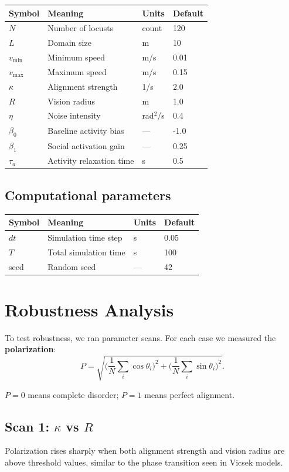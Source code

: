 \documentclass[11pt,a4paper]{article}
\begin{document}
\begin{tabular}{@{}llll@{}}
\toprule
Symbol & Meaning & Units & Default \\
\midrule
$N$ & Number of locusts & count & 120 \\
$L$ & Domain size & m & 10 \\
$v_{\min}$ & Minimum speed & m/s & 0.01 \\
$v_{\max}$ & Maximum speed & m/s & 0.15 \\
$\kappa$ & Alignment strength & 1/s & 2.0 \\
$R$ & Vision radius & m & 1.0 \\
$\eta$ & Noise intensity & rad$^2$/s & 0.4 \\
$\beta_0$ & Baseline activity bias & --- & -1.0 \\
$\beta_1$ & Social activation gain & --- & 0.25 \\
$\tau_a$ & Activity relaxation time & s & 0.5 \\
\bottomrule
\end{tabular}

\subsection{Computational parameters}

\begin{tabular}{@{}llll@{}}
\toprule
Symbol & Meaning & Units & Default \\
\midrule
$dt$ & Simulation time step & s & 0.05 \\
$T$ & Total simulation time & s & 100 \\
seed & Random seed & --- & 42 \\
\bottomrule
\end{tabular}

\section{Robustness Analysis}

To test robustness, we ran parameter scans. For each case we measured the \textbf{polarization}:
\[
P = \sqrt{\Big(\frac{1}{N}\sum_i \cos \theta_i\Big)^2 + \Big(\frac{1}{N}\sum_i \sin \theta_i\Big)^2}.
\]

$P=0$ means complete disorder; $P=1$ means perfect alignment.

\subsection{Scan 1: $\kappa$ vs $R$}
Polarization rises sharply when both alignment strength and vision radius are above threshold values, similar to the phase transition seen in Vicsek models.
\end{document}
